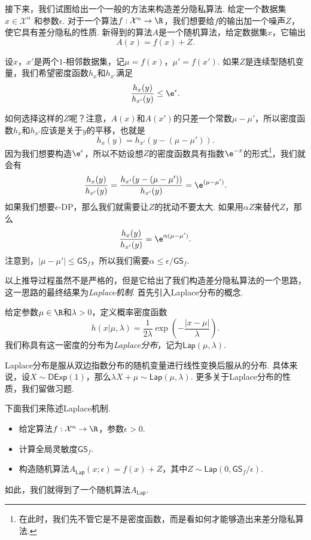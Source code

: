 接下来，我们试图给出一个一般的方法来构造差分隐私算法. 给定一个数据集$x \in \mathcal X^n$ 和参数$\epsilon$. 对于一个算法$f:\mathcal X^n \to \R$，我们想要给$f$的输出加一个噪声$Z$，使它具有差分隐私的性质. 新得到的算法$A$是一个随机算法，给定数据集$x$，它输出
\[
    A(x)=f(x)+Z.
\]

设$x$，$x'$是两个$1$-相邻数据集，记$\mu = f(x)$，$\mu' = f(x')$. 如果$Z$是连续型随机变量，我们希望密度函数$h_{x}$和$h_{x'}$满足
\[
    \frac{h_{x}(y)}{h_{x'}(y)} \leq \e^{\epsilon}.
\]

如何选择这样的$Z$呢？注意，$A(x)$和$A(x')$的只差一个常数$\mu - \mu'$，所以密度函数$h_{x}$和$h_{x'}$应该是关于$y$的平移，也就是
\[
    h_{x}(y) = h_{x'}(y - (\mu - \mu')).
\]
因为我们想要构造$\e^\epsilon$，所以不妨设想$Z$的密度函数具有指数$\e^{-x}$的形式\footnote{在此时，我们先不管它是不是密度函数，而是看如何才能够造出来差分隐私算法.}，我们就会有
\[
    \frac{h_{x}(y)}{h_{x'}(y)} = \frac{h_{x'}(y - (\mu - \mu'))}{h_{x'}(y)} = \e^{(\mu - \mu')}.
\]
如果我们想要$\epsilon$-DP，那么我们就需要让$Z$的扰动不要太大. 如果用$\alpha Z$来替代$Z$，那么
\[
    \frac{h_{x}(y)}{h_{x'}(y)} = \e^{\alpha(\mu - \mu')}.
\]
注意到，$|\mu - \mu'| \leq \mathsf{GS}_f$，所以我们需要$\alpha \leq \epsilon/\mathsf{GS}_f$.

以上推导过程虽然不是严格的，但是它给出了我们构造差分隐私算法的一个思路，这一思路的最终结果为\emph{Laplace机制}. 首先引入Laplace分布的概念.

\begin{definition}[Laplace分布]
    给定参数$\mu\in\R$和$\lambda>0$，定义概率密度函数
        \[h(x  | \mu, \lambda) = \frac1{2\lambda}\exp\left(- \frac{|x - \mu|}{\lambda}\right).\]
我们称具有这一密度的分布为\emph{Laplace分布}，记为$\mathsf{Lap}(\mu,\lambda)$.
\end{definition}

Laplace分布是服从双边指数分布的随机变量进行线性变换后服从的分布. 具体来说，设$X\sim\mathsf{DExp}(1)$，那么$\lambda X+\mu\sim\mathsf{Lap}(\mu,\lambda)$. 更多关于Laplace分布的性质，我们留做习题. 

下面我们来陈述Laplace机制.

\begin{itemize}
    \item 给定算法$f:\mathcal X^n \to \R$，参数$\epsilon>0$.
    \item 计算全局灵敏度$\mathsf{GS}_f$.
    \item 构造随机算法$A_{\mathsf{Lap}}(x;\epsilon) = f(x) + Z$，其中$Z\sim \mathsf{Lap}(0, \mathsf{GS}_f/\epsilon)$.
\end{itemize}
如此，我们就得到了一个随机算法$A_{\mathsf{Lap}}$. 

